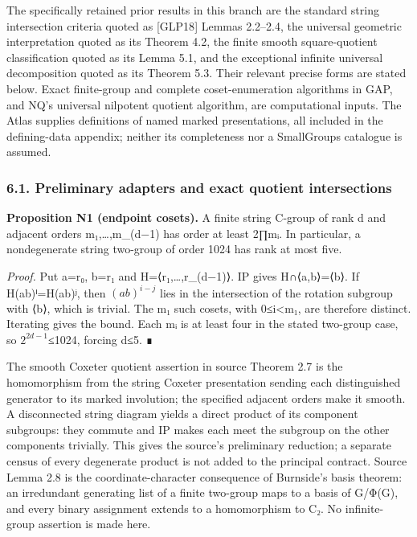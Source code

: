 \documentclass[
  11pt,
  a4paper,
]{article}
\begin{document}
The specifically retained prior results in this branch are the standard
string intersection criteria quoted as {[}GLP18{]} Lemmas 2.2--2.4, the
universal geometric interpretation quoted as its Theorem 4.2, the finite
smooth square-quotient classification quoted as its Lemma 5.1, and the
exceptional infinite universal decomposition quoted as its Theorem 5.3.
Their relevant precise forms are stated below. Exact finite-group and
complete coset-enumeration algorithms in GAP, and NQ's universal
nilpotent quotient algorithm, are computational inputs. The Atlas
supplies definitions of named marked presentations, all included in the
defining-data appendix; neither its completeness nor a SmallGroups
catalogue is assumed.

\subsubsection{6.1. Preliminary adapters and exact quotient
intersections}\label{preliminary-adapters-and-exact-quotient-intersections}

\textbf{Proposition N1 (endpoint cosets).} A finite string C-group of
rank d and adjacent orders m₁,\ldots,m\_(d−1) has order at least 2∏mᵢ.
In particular, a nondegenerate string two-group of order 1024 has rank
at most five.

\emph{Proof.} Put a=r₀, b=r₁ and H=⟨r₁,\ldots,r\_(d−1)⟩. IP gives
H∩⟨a,b⟩=⟨b⟩. If H(ab)ⁱ=H(ab)ʲ, then \((ab)^{i-j}\) lies in the
intersection of the rotation subgroup with ⟨b⟩, which is trivial. The m₁
such cosets, with 0≤i\textless m₁, are therefore distinct. Iterating
gives the bound. Each mᵢ is at least four in the stated two-group case,
so \(2^{2d-1}\)≤1024, forcing d≤5. ∎

The smooth Coxeter quotient assertion in source Theorem 2.7 is the
homomorphism from the string Coxeter presentation sending each
distinguished generator to its marked involution; the specified adjacent
orders make it smooth. A disconnected string diagram yields a direct
product of its component subgroups: they commute and IP makes each meet
the subgroup on the other components trivially. This gives the source's
preliminary reduction; a separate census of every degenerate product is
not added to the principal contract. Source Lemma 2.8 is the
coordinate-character consequence of Burnside's basis theorem: an
irredundant generating list of a finite two-group maps to a basis of
G/Φ(G), and every binary assignment extends to a homomorphism to C₂. No
infinite-group assertion is made here.
\end{document}
